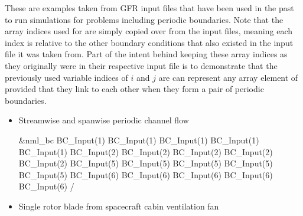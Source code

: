 \label{SEC:BC:Numerical:Periodic:Examples}

These are examples taken from GFR input files that have been used in the past to
run simulations for problems including periodic boundaries.
%
Note that the array indices used for  are simply copied over
from the input files, meaning each index is relative to the other boundary
conditions that also existed in the input file it was taken from.
%
Part of the intent behind keeping these array indices as they originally were in
their respective input file is to demonstrate that the previously used variable
indices of $i$ and $j$ are can represent any array element of
 provided that they link to each other when they form a pair
of periodic boundaries.
%
\begin{itemize}
  \item Streamwise and spanwise periodic channel flow
    \begin{nmldescitem}[fontupper=\ttfamily\scriptsize,
                        listing options={escapeinside={!@}{!@}}]
&nml_bc
  BC_Input(1)%
  BC_Input(1)%
  BC_Input(1)%
  BC_Input(1)%
  BC_Input(1)%
  BC_Input(2)%
  BC_Input(2)%
  BC_Input(2)%
  BC_Input(2)%
  BC_Input(2)%
  BC_Input(5)%
  BC_Input(5)%
  BC_Input(5)%
  BC_Input(5)%
  BC_Input(5)%
  BC_Input(6)%
  BC_Input(6)%
  BC_Input(6)%
  BC_Input(6)%
  BC_Input(6)%
/
    \end{nmldescitem}
  \item Single rotor blade from spacecraft cabin ventilation
    fan\cite{Spiegel_2025}
    \begin{itemize}[before=\small]

\end{itemize}
\end{itemize}
